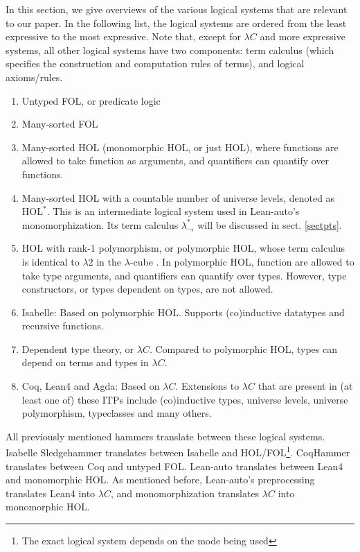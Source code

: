   In this section, we give overviews of the various logical systems
  that are relevant to our paper. In the following list, the logical systems
  are ordered from the least expressive to the most expressive. Note that, except
  for $\lambda C$ and more expressive systems, all other logical systems have
  two components: term calculus (which specifies the construction and computation
  rules of terms), and logical axioms/rules.
  \begin{enumerate}
    \item Untyped FOL, or predicate logic
    \item Many-sorted FOL
    \item Many-sorted HOL (monomorphic HOL, or just HOL), where functions are allowed
      to take function as arguments, and quantifiers can quantify over functions.
    \item Many-sorted HOL with a countable number of universe levels, denoted as $\text{HOL}^*$. This is an
      intermediate logical system used in Lean-auto's monomorphization. Its term calculus $\lambda_\to^*$
      will be discussed in sect. \ref{sectpts}.
    \item HOL with rank-1 polymorphism, or polymorphic HOL, whose term calculus is identical
      to $\lambda 2$ in the $\lambda$-cube \cite{LambdaWithType}. In polymorphic HOL, function are
      allowed to take type arguments, and quantifiers can quantify over types. However, type
      constructors, or types dependent on types, are not allowed.
    \item Isabelle: Based on polymorphic HOL. Supports (co)inductive datatypes and recursive functions.
    \item Dependent type theory, or $\lambda C$. Compared to polymorphic HOL, types can depend on terms and types in $\lambda C$.
    \item Coq, Lean4 and Agda: Based on $\lambda C$. Extensions to $\lambda C$ that are
      present in (at least one of) these ITPs include (co)inductive types, universe levels,
      universe polymorphism, typeclasses and many others.
  \end{enumerate}
  
  \noindent All previously mentioned hammers translate between these logical systems. Isabelle
  Sledgehammer translates between Isabelle and
  HOL/FOL\footnote{The exact logical system depends on the mode being used}.
  CoqHammer translates between Coq and untyped FOL. Lean-auto translates
  between Lean4 and monomorphic HOL. As mentioned before, Lean-auto's
  preprocessing translates Lean4 into $\lambda C$, and monomorphization
  translates $\lambda C$ into monomorphic HOL.


